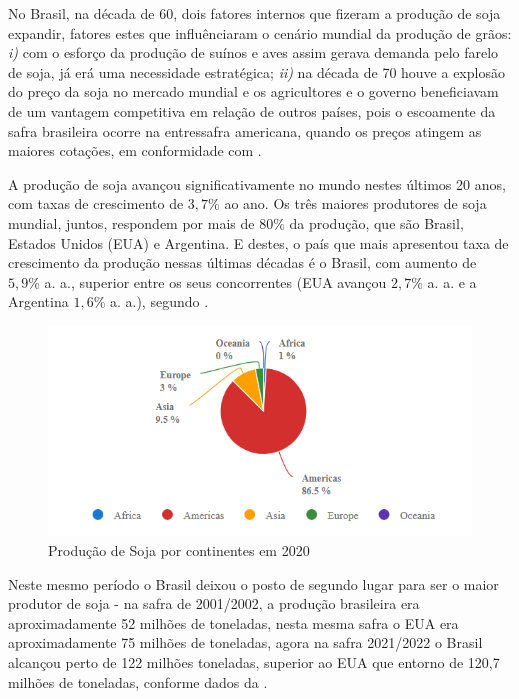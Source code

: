 \documentclass[
	12pt,				%
	openright,			%
	oneside,      %
	a4paper,			%
	english,			%
	french,				%
	spanish,			%
	brazil,				%
	]{abntex2}\usepackage[]{graphicx}\usepackage[table]{xcolor}
\theoremstyle{definition}
\theoremstyle{remark}
\begin{document}
No Brasil, na década de 60, dois fatores internos que fizeram a produção de 
soja expandir, fatores estes que influênciaram o cenário mundial da produção de grãos: \textit{i)} com o esforço da produção de suínos e aves assim gerava demanda pelo farelo de soja, já erá uma necessidade estratégica; \textit{ii)} na década de 70 houve a explosão 
do preço da soja no mercado mundial e os agricultores e o governo beneficiavam de um 
vantagem competitiva em relação de outros países, pois o escoamente da safra brasileira ocorre na entressafra americana, quando os preços atingem as maiores cotações, em conformidade com \cite{embrapa2022}.


A produção de soja avançou significativamente no mundo nestes últimos 20 anos, com taxas 
de crescimento de $3,7\%$ ao ano. Os três maiores produtores de soja mundial, juntos, respondem por mais de $80\%$ da produção, que são Brasil, Estados Unidos (EUA) e Argentina. E destes, o país que mais apresentou taxa de crescimento da produção nessas últimas décadas é o Brasil, com aumento de $5,9\%$ a. a., superior entre os seus concorrentes (EUA avançou $2,7\%$ a. a. e a Argentina $1,6\%$ a. a.), segundo \cite{cepea2022}.

\begin{figure}
  \caption{\label{imagen1}Produção de Soja por continentes em 2020}
    \begin{center}
      \includegraphics[width=12cm]{image/img1.png}
    \end{center}
\end{figure}


Neste mesmo período o Brasil deixou o posto de segundo lugar para ser o maior produtor de soja - na safra de 2001/2002, a produção brasileira era aproximadamente 52 milhões de toneladas, nesta mesma safra o EUA era aproximadamente 75 milhões de toneladas, agora na safra 2021/2022 o Brasil alcançou perto de 122 milhões toneladas, superior ao EUA que entorno de 120,7 milhões de toneladas, conforme dados da \cite{conab2022}.
\end{document}
